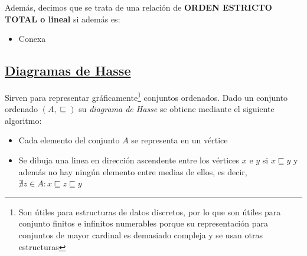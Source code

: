 \documentclass[10pt,a4paper,openright]{book}
\begin{document}
Además, decimos que se trata de una relación de \textbf{ORDEN ESTRICTO TOTAL o lineal} si además es:
\begin{itemize}
\item Conexa
\end{itemize}

\subsection*{\underline{Diagramas de Hasse}}
Sirven para representar gráficamente\footnote{Son útiles para estructuras de datos discretos, por lo que son útiles para conjunto finitos e infinitos numerables porque su representación para conjuntos de mayor cardinal es demasiado compleja y se usan otras estructuras} conjuntos ordenados. Dado un conjunto ordenado $(A,\sqsubseteq)$ su \textit{diagrama de Hasse} se obtiene mediante el siguiente algoritmo:
\begin{itemize}
\item Cada elemento del conjunto $A$ se representa en un vértice

\item Se dibuja una linea en dirección ascendente entre los vértices $x$ e $y$ si $x\sqsubseteq y$ y además no hay ningún elemento entre medias de ellos, es decir, $\nexists z\in A: x\sqsubseteq z \sqsubseteq y$
\end{itemize}
\end{document}
